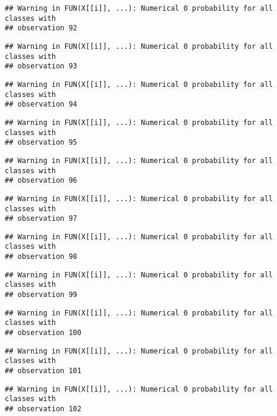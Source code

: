 \documentclass[
]{article}
\begin{document}
\begin{verbatim}
## Warning in FUN(X[[i]], ...): Numerical 0 probability for all classes with
## observation 92
\end{verbatim}

\begin{verbatim}
## Warning in FUN(X[[i]], ...): Numerical 0 probability for all classes with
## observation 93
\end{verbatim}

\begin{verbatim}
## Warning in FUN(X[[i]], ...): Numerical 0 probability for all classes with
## observation 94
\end{verbatim}

\begin{verbatim}
## Warning in FUN(X[[i]], ...): Numerical 0 probability for all classes with
## observation 95
\end{verbatim}

\begin{verbatim}
## Warning in FUN(X[[i]], ...): Numerical 0 probability for all classes with
## observation 96
\end{verbatim}

\begin{verbatim}
## Warning in FUN(X[[i]], ...): Numerical 0 probability for all classes with
## observation 97
\end{verbatim}

\begin{verbatim}
## Warning in FUN(X[[i]], ...): Numerical 0 probability for all classes with
## observation 98
\end{verbatim}

\begin{verbatim}
## Warning in FUN(X[[i]], ...): Numerical 0 probability for all classes with
## observation 99
\end{verbatim}

\begin{verbatim}
## Warning in FUN(X[[i]], ...): Numerical 0 probability for all classes with
## observation 100
\end{verbatim}

\begin{verbatim}
## Warning in FUN(X[[i]], ...): Numerical 0 probability for all classes with
## observation 101
\end{verbatim}

\begin{verbatim}
## Warning in FUN(X[[i]], ...): Numerical 0 probability for all classes with
## observation 102
\end{verbatim}
\end{document}
